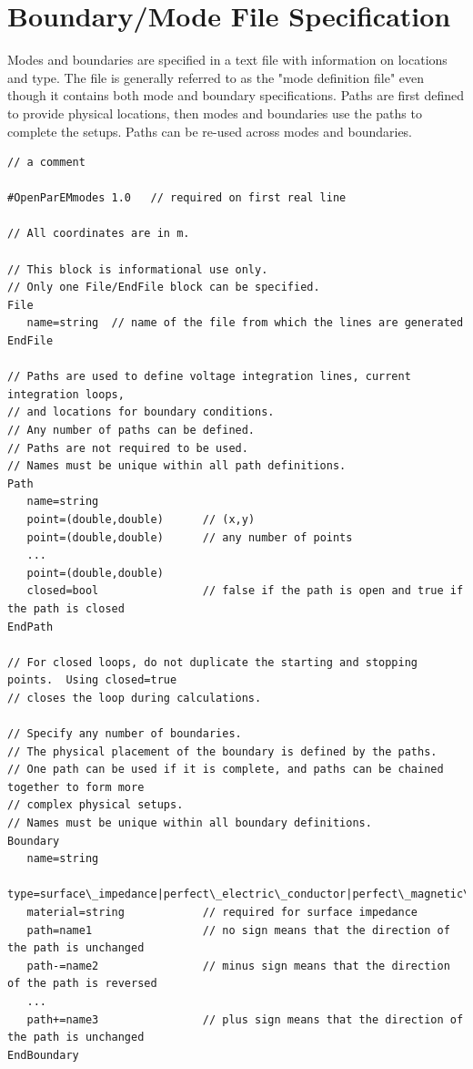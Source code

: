 \documentclass[titlepage]{article}
\renewcommand\_{\textunderscore\linebreak[1]}
\begin{document}
\newpage
\section{Boundary/Mode File Specification}
\label{sec:mode_file_spec}

Modes and boundaries are specified in a text file with information on locations and type. The file is generally referred to as the "mode definition file" even though it contains both mode and boundary specifications.  Paths are first defined to provide physical locations, then modes and boundaries use the paths to complete the setups.  Paths can be re-used across modes and boundaries.
\newline

\begin{Verbatim}[fontsize=\small]
// a comment

#OpenParEMmodes 1.0   // required on first real line

// All coordinates are in m.

// This block is informational use only.
// Only one File/EndFile block can be specified.
File
   name=string  // name of the file from which the lines are generated
EndFile

// Paths are used to define voltage integration lines, current integration loops, 
// and locations for boundary conditions.
// Any number of paths can be defined.
// Paths are not required to be used.
// Names must be unique within all path definitions.
Path
   name=string
   point=(double,double)      // (x,y)
   point=(double,double)      // any number of points
   ...
   point=(double,double)
   closed=bool                // false if the path is open and true if the path is closed
EndPath

// For closed loops, do not duplicate the starting and stopping points.  Using closed=true
// closes the loop during calculations.

// Specify any number of boundaries.
// The physical placement of the boundary is defined by the paths.
// One path can be used if it is complete, and paths can be chained together to form more
// complex physical setups.
// Names must be unique within all boundary definitions.
Boundary
   name=string
   type=surface\_impedance|perfect\_electric\_conductor|perfect\_magnetic\_conductor
   material=string            // required for surface impedance
   path=name1                 // no sign means that the direction of the path is unchanged    
   path-=name2                // minus sign means that the direction of the path is reversed
   ...
   path+=name3                // plus sign means that the direction of the path is unchanged
EndBoundary


\end{Verbatim}
\end{document}

